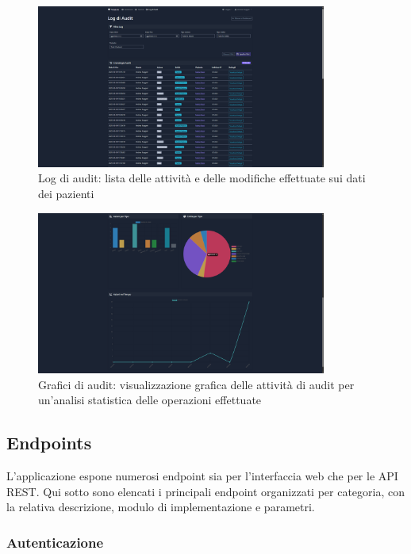 \documentclass[12pt,a4paper,oneside]{report}
\begin{document}
\begin{figure}[H]
    \centering
    \includegraphics[width=0.85\textwidth]{images/screen/audit list.png}
    \caption{Log di audit: lista delle attività e delle modifiche effettuate sui dati dei pazienti}
    \label{fig:audit-list}
\end{figure}

\begin{figure}[H]
    \centering
    \includegraphics[width=0.85\textwidth]{images/screen/audit graph.png}
    \caption{Grafici di audit: visualizzazione grafica delle attività di audit per un'analisi statistica delle operazioni effettuate}
    \label{fig:audit-graph}
\end{figure}

\subsection{Endpoints}

L'applicazione espone numerosi endpoint sia per l'interfaccia web che per le API REST. Qui sotto sono elencati i principali endpoint organizzati per categoria, con la relativa descrizione, modulo di implementazione e parametri.

\subsubsection{Autenticazione}
\end{document}
